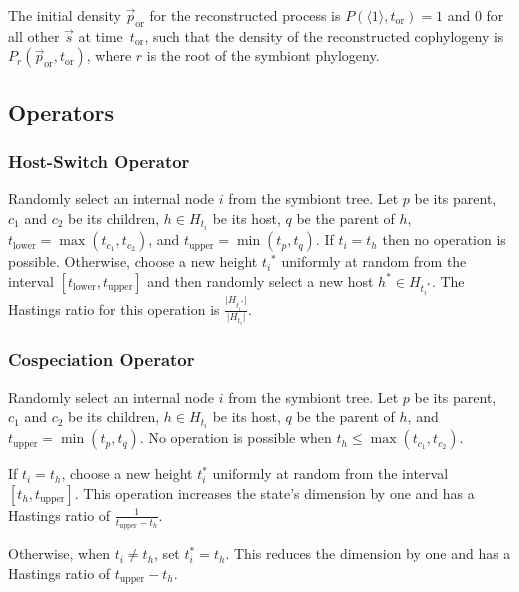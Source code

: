\documentclass{article}
\begin{document}
            The initial density $\vec{p}_\text{or}$ for the reconstructed
            process is $P\left(\langle1\rangle, t_\text{or}\right) = 1$ and 0
            for all other $\vec{s}$ at time~$t_\text{or}$, such that the
            density of the reconstructed cophylogeny is
            $P_r\left(\vec{p}_\text{or}, t_\text{or}\right)$, where $r$ is the
            root of the symbiont phylogeny.

        \subsection*{Operators}

            \subsubsection*{Host-Switch Operator}

                Randomly select an internal node $i$ from the symbiont tree.
                Let $p$ be its parent, $c_1$ and $c_2$ be its children, $h \in
                H_{t_i}$ be its host, $q$ be the parent of $h$, $t_\text{lower}
                = \max\left(t_{c_1},t_{c_2}\right)$, and $t_\text{upper} =
                \min\left(t_p,t_q\right)$. If $t_i = t_h$ then no operation is
                possible.  Otherwise, choose a new height ${t_i}^*$ uniformly
                at random from the interval $\left[t_\text{lower},
                t_\text{upper}\right]$ and then randomly select a new host $h^*
                \in H_{{t_i}^*}$.  The Hastings ratio for this operation is
                $\frac{\lvert{H_{{t_i}^*}}\rvert} {\lvert{H_{t_i}}\rvert}$.

            \subsubsection*{Cospeciation Operator}

                Randomly select an internal node $i$ from the symbiont tree.
                Let $p$ be its parent, $c_1$ and $c_2$ be its children, $h \in
                H_{t_i}$ be its host, $q$ be the parent of $h$, and
                $t_\text{upper} = \min\left(t_p,t_q\right)$. No operation is
                possible when $t_h \leq \max\left(t_{c_1},t_{c_2}\right)$.

                If $t_i = t_h$, choose a new height $t_i^*$ uniformly at random
                from the interval $\left[t_h, t_\text{upper}\right]$. This
                operation increases the state's dimension by one and has a
                Hastings ratio of $\frac{1}{t_\text{upper} - t_h}$.

                Otherwise, when $t_i \neq t_h$, set $t_i^* = t_h$. This reduces
                the dimension by one and has a Hastings ratio of
                $t_\text{upper} - t_h$.
\end{document}
